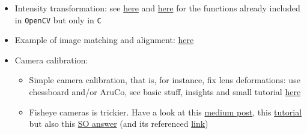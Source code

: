 \documentclass[a4paper,12pt,%
              final%
              ]{article}
\begin{document}
\begin{itemize}
  \item Intensity transformation: see \href{https://www.geeksforgeeks.org/python-intensity-transformation-operations-on-images/}{here} and \href{https://docs.opencv.org/4.5.0/dc/dfe/group__intensity__transform.html}{here} for the functions already included in \texttt{OpenCV} but only in \texttt{C}
  \item Example of image matching and alignment: \href{https://www.pyimagesearch.com/2020/08/31/image-alignment-and-registration-with-opencv/}{here}
  \item Camera calibration:
    \begin{itemize}
      \item Simple camera calibration, that is, for instance, fix lens deformations: use chessboard and/or AruCo, see basic stuff, insights and small tutorial \href{https://docs.opencv.org/master/dc/dbb/tutorial_py_calibration.html}{here}
      \item Fisheye cameras is trickier. Have a look at this \href{https://medium.com/@kennethjiang/calibrate-fisheye-lens-using-opencv-333b05afa0b0}{medium post}, this \href{https://docs.opencv.org/3.2.0/dd/d12/tutorial_omnidir_calib_main.html}{tutorial} but also this \href{https://stackoverflow.com/a/53500300}{SO answer} (and its referenced \href{http://paulbourke.net/dome/fish2/}{link})
    \end{itemize}
\end{itemize}

\end{document}
